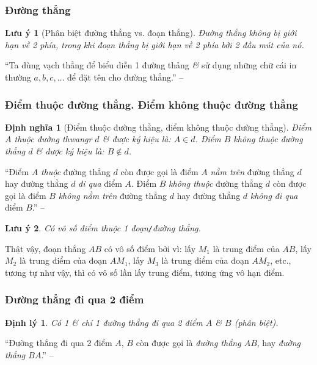 \documentclass{article}
\numberwithin{equation}{section}
\newtheorem{dinhnghia}{Định nghĩa}[section]
\newtheorem{luuy}{Lưu ý}[section]
\newtheorem{dinhly}{Định lý}[section]
\begin{document}
\subsubsection{Đường thẳng}

\begin{luuy}[Phân biệt đường thẳng vs. đoạn thẳng]
	Đường thẳng không bị giới hạn về 2 phía, trong khi đoạn thẳng bị giới hạn về 2 phía bởi 2 đầu mút của nó.
\end{luuy}
``Ta dùng vạch thẳng để biểu diễn 1 đường thảng \textit{\&} sử dụng những chữ cái in thường $a,b,c,\ldots$ để đặt tên cho đường thẳng.'' -- \cite[p. 76]{SGK_Toan_6_Canh_Dieu_tap_2}

\subsubsection{Điểm thuộc đường thẳng. Điểm không thuộc đường thẳng}

\begin{dinhnghia}[Điểm thuộc đường thẳng, điểm không thuộc đường thẳng]
	Điểm $A$ \emph{thuộc} đường thwangr $d$ \textit{\&} được ký hiệu là: $A\in d$. Điểm $B$ \emph{không thuộc} đường thẳng $d$ \textit{\&} được ký hiệu là: $B\notin d$.
\end{dinhnghia}
``Điểm $A$ \textit{thuộc} đường thẳng $d$ còn được gọi là điểm $A$ \textit{nằm trên} đường  thẳng $d$ hay đường thẳng $d$ \textit{đi qua} điểm $A$. Điểm $B$ \textit{không thuộc} đường thẳng $d$ còn được gọi là điểm $B$ \textit{không nằm trên} đường thẳng $d$ hay đường thẳng $d$ \textit{không đi qua} điểm $B$.'' -- \cite[p. 76]{SGK_Toan_6_Canh_Dieu_tap_2}

\begin{luuy}
	Có vô số điểm thuộc 1 đoạn\texttt{/}đường thẳng.
\end{luuy}
Thật vậy, đoạn thẳng $AB$ có vô số điểm bởi vì: lấy $M_1$ là trung điểm của $AB$, lấy $M_2$ là trung điểm của đoạn $AM_1$, lấy $M_3$ là trung điểm của đoạn $AM_2$, etc., tương tự như vậy, thì có vô số lần lấy trung điểm, tương ứng vô hạn điểm.

\subsubsection{Đường thẳng đi qua 2 điểm}

\begin{dinhly}
	Có 1 \textit{\&} chỉ 1 đường thẳng đi qua 2 điểm $A$ \textit{\&} $B$ (phân biệt).
\end{dinhly}
``Đường thẳng đi qua 2 điểm $A$, $B$ còn được gọi là \textit{đường thẳng $AB$}, hay \textit{đường thẳng $BA$}.'' -- \cite[p. 77]{SGK_Toan_6_Canh_Dieu_tap_2}
\end{document}
